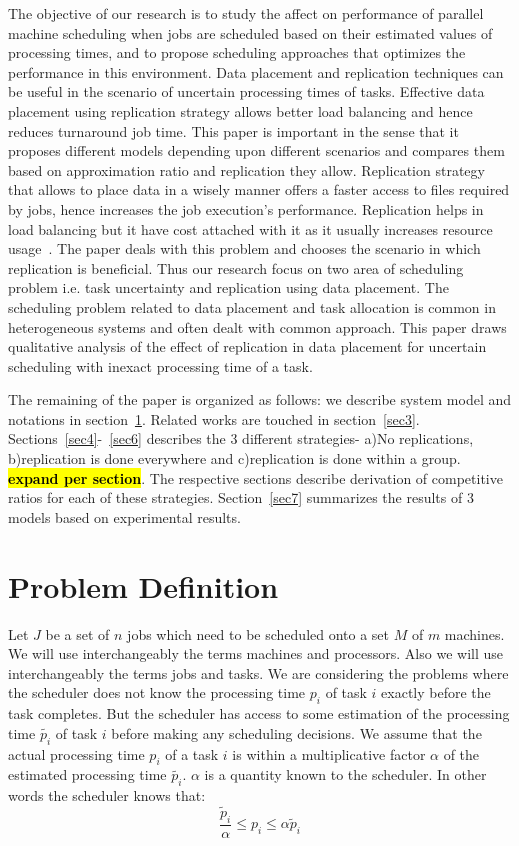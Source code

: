 \documentclass[10pt, conference, compsocconf]{IEEEtran}
\newcommand{\todo}[1]{{\color{red}\textbf{\hl{#1}}\xspace}}
\begin{document}
The objective of our research is to study the affect on performance of
parallel machine scheduling when jobs are scheduled based on their
estimated values of processing times, and to propose scheduling
approaches that optimizes the performance in this environment. Data
placement and replication techniques can be useful in the scenario of
uncertain processing times of tasks. Effective data placement using
replication strategy allows better load balancing and hence reduces
turnaround job time. This paper is important in the sense that it
proposes different models depending upon different scenarios and
compares them based on approximation ratio and replication they
allow. Replication strategy that allows to place data in a wisely
manner offers a faster access to files required by jobs, hence
increases the job execution's performance. Replication helps in load
balancing but it have cost attached with it as it usually increases
resource usage~\cite{DBLP:journals/corr/WangJW14}. The paper deals
with this problem and chooses the scenario in which replication is
beneficial. Thus our research focus on two area of scheduling problem
i.e. task uncertainty and replication using data placement. The
scheduling problem related to data placement and task allocation is
common in heterogeneous systems and often dealt with common
approach. This paper draws qualitative analysis of the effect of
replication in data placement for uncertain scheduling with inexact
processing time of a task.

The remaining of the paper is organized as follows: we describe system
model and notations in section~\ref{sec2}. Related works are touched
in section~\ref{sec3}.  Sections~\ref{sec4}-~\ref{sec6} describes the
3 different strategies- a)No replications, b)replication is done
everywhere and c)replication is done within a group. \todo{expand per
  section}. The respective sections describe derivation of competitive
ratios for each of these strategies. Section~\ref{sec7} summarizes the
results of 3 models based on experimental results.

\section{Problem Definition}\label{sec2}
Let $J$ be a set of $n$ jobs which need to be scheduled onto a set $M$
of $m$ machines. We will use interchangeably the terms machines and
processors. Also we will use interchangeably the terms jobs and
tasks. We are considering the problems where the scheduler does not
know the processing time $p_i$ of task $i$ exactly before the task
completes.  But the scheduler has access to some estimation of the
processing time $\tilde{p_i}$ of task $i$ before making any scheduling
decisions. We assume that the actual processing time $p_i$ of a task
$i$ is within a multiplicative factor $\alpha$ of the estimated
processing time $\tilde{p_i}$. $\alpha$ is a quantity known to the
scheduler. In other words the scheduler knows that:
 \begin{equation}\label{eq1}
\frac{\tilde{p}_{i}}{\alpha}\leq p_{i}\leq \alpha \tilde{p}_{i}
\end{equation}
\end{document}
